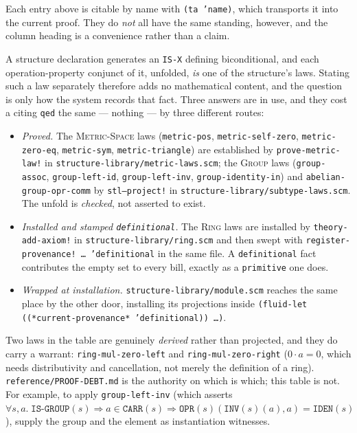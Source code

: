 \begin{remark}
Each entry above is citable by name with \texttt{(ta 'name)}, which transports
it into the current proof.  They do \emph{not} all have the same standing,
however, and the column heading is a convenience rather than a claim.

A structure declaration generates an \texttt{IS-X} defining biconditional, and
each operation-property conjunct of it, unfolded, \emph{is} one of the
structure's laws.  Stating such a law separately therefore adds no mathematical
content, and the question is only how the system records that fact.  Three
answers are in use, and they cost a citing \texttt{qed} the same --- nothing ---
by three different routes:

\begin{itemize}
\item \emph{Proved.}  The \textsc{Metric-Space} laws (\texttt{metric-pos},
  \texttt{metric-self-zero}, \texttt{metric-zero-eq}, \texttt{metric-sym},
  \texttt{metric-triangle}) are established by \texttt{prove-metric-law!} in
  \texttt{structure-library/metric-laws.scm}; the \textsc{Group} laws
  (\texttt{group-assoc}, \texttt{group-left-id}, \texttt{group-left-inv},
  \texttt{group-identity-in}) and \texttt{abelian-group-opr-comm} by
  \texttt{stl--project!} in \texttt{structure-library/subtype-laws.scm}.  The
  unfold is \emph{checked}, not asserted to exist.
\item \emph{Installed and stamped \texttt{definitional}.}  The \textsc{Ring}
  laws are installed by \texttt{theory-add-axiom!} in
  \texttt{structure-library/ring.scm} and then swept with
  \texttt{register-provenance!\ \ldots\ 'definitional} in the same file.  A
  \texttt{definitional} fact contributes the empty set to every bill, exactly as
  a \texttt{primitive} one does.
\item \emph{Wrapped at installation.}  \texttt{structure-library/module.scm}
  reaches the same place by the other door, installing its projections inside
  \texttt{(fluid-let ((*current-provenance* 'definitional)) \ldots)}.
\end{itemize}

Two laws in the table are genuinely \emph{derived} rather than projected, and
they do carry a warrant: \texttt{ring-mul-zero-left} and
\texttt{ring-mul-zero-right} ($0\cdot a = 0$, which needs distributivity and
cancellation, not merely the definition of a ring).
\texttt{reference/PROOF-DEBT.md} is the authority on which is which; this table
is not.  For example, to apply
\texttt{group-left-inv} (which asserts
$\forall s,a.\;\texttt{IS-GROUP}(s)\Rightarrow a\in\texttt{CARR}(s)
 \Rightarrow \texttt{OPR}(s)(\texttt{INV}(s)(a),a)=\texttt{IDEN}(s)$),
supply the group and the element as instantiation witnesses.
\end{remark}


